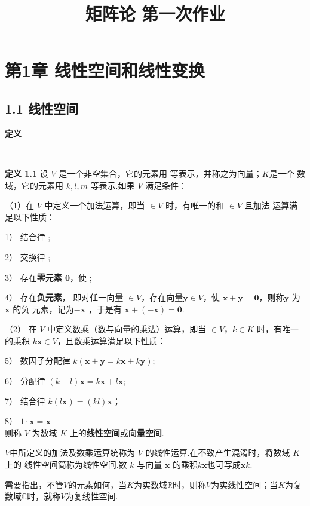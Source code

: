 \documentclass[12pt, a4paper, oneside, fontset=none]{ctexart}
\author{}
\date{}
\title{\vspace{-3em}\textbf{矩阵论 \quad 第一次作业}\vspace{-3em}}
\begin{document}
\maketitle

\section*{第1章 \quad 线性空间和线性变换}

\subsection*{1.1 \quad 线性空间}

\centerline{\large{\textbf{定义}}} \ \par

\textbf{定义 1.1} \quad 设 $V$ 是一个非空集合，它的元素用  等表示，并称之为向量；$K$是一个
数域，它的元素用 $k,l,m$ 等表示.如果 $V$ 满足条件：\par
（1）在 $V$ 中定义一个加法运算，即当 $\in V$ 时，有唯一的和 $\in V$ 且加法
运算满足以下性质：\par
1） 结合律 ; \par
2） 交换律 ; \par
3） 存在\textbf{零元素 0}，使 ; \par
4） 存在\textbf{负元素}， 即对任一向量 $\in V$，存在向量$ \bm{y} \in V$，使 $\bm{x + y = 0}$，则称$\bm{y}$ 为 $\bm{x}$ 的负
元素，记为$\bm{-x}$ ，于是有 $\bm{x + (- x) = 0}$. \par
（2） 在 $V$ 中定义数乘（数与向量的乘法）运算，即当 $\in V$，$k \in K$ 时，有唯一的乘积
$k\bm{x} \in V$，且数乘运算满足以下性质： \par
5） 数因子分配律 $k(\bm{x + y} = k \bm{x} + k \bm{y})$; \par
6） 分配律 $(k + l) \bm{x} = k \bm{x} + l \bm{x}$; \par
7） 结合律 $k(l \bm{x}) = (kl) \bm{x}$； \par
8） $1 \cdot \bm{x} = \bm{x}$ \\
则称 $V$ 为数域 $K$ 上的\textbf{线性空间}或\textbf{向量空间}. \par

$V$中所定义的加法及数乘运算统称为 $V$ 的线性运算.在不致产生混淆时，将数域 $K$ 上的
线性空间简称为线性空间.数 $k$ 与向量 $\bm{x}$ 的乘积$k\bm{x}$也可写成$\bm{x}k$. \par

需要指出，不管$V$的元素如何，当$K$为实数域$\mathbb{R}$时，则称$V$为实线性空间；当$K$为复
数域$\mathbb{C}$时，就称$V$为复线性空间.
\end{document}
